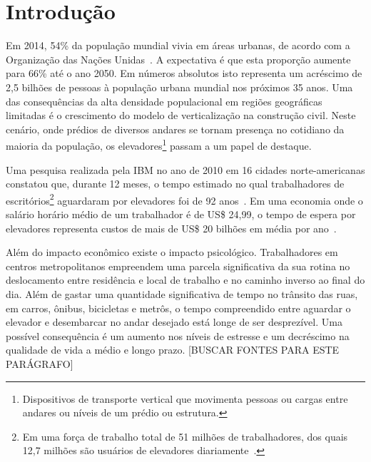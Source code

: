 \chapter{\label{chap:intro}Introdução}


Em 2014, 54\% da população mundial vivia em áreas urbanas, de acordo com a Organização das Nações Unidas~\cite{UN14}. A expectativa é que esta proporção aumente para 66\% até o ano 2050. Em números absolutos isto representa um acréscimo de 2,5 bilhões de pessoas à população urbana mundial nos próximos 35 anos. Uma das consequências da alta densidade populacional em regiões geográficas limitadas é o crescimento do modelo de verticalização na construção civil. Neste cenário, onde prédios de diversos andares se tornam presença no cotidiano da maioria da população, os elevadores\footnote{Dispositivos de transporte vertical que movimenta pessoas ou cargas entre andares ou níveis de um prédio ou estrutura.} passam a um papel de destaque.

Uma pesquisa realizada pela IBM no ano de 2010 em 16 cidades norte-americanas constatou que, durante 12 meses, o tempo estimado no qual trabalhadores de escritórios\footnote{Em uma força de trabalho total de 51 milhões de trabalhadores, dos quais 12,7 milhões são usuários de elevadores diariamente~\cite{IBM10}.} aguardaram por elevadores foi de 92 anos~\cite{IBM10}. Em uma economia onde o salário horário médio de um trabalhador é de US\$ 24,99, o tempo de espera por elevadores representa custos de mais de US\$ 20 bilhões em média por ano~\cite{BLS15}.

Além do impacto econômico existe o impacto psicológico. Trabalhadores em centros metropolitanos empreendem uma parcela significativa da sua rotina no deslocamento entre residência e local de trabalho e no caminho inverso ao final do dia. Além de gastar uma quantidade significativa de tempo no trânsito das ruas, em carros, ônibus, bicicletas e metrôs, o tempo compreendido entre aguardar o elevador e desembarcar no andar desejado está longe de ser desprezível. Uma possível consequência é um aumento nos níveis de estresse e um decréscimo na qualidade de vida a médio e longo prazo. {\color{red}[BUSCAR FONTES PARA ESTE PARÁGRAFO]} %

